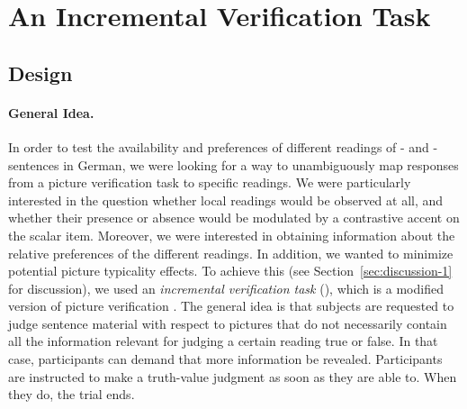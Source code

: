 \documentclass[fleqn,reqno,10pt]{article}
\newcommand{\as}{\acro{as}}
\renewcommand{\es}{\acro{es}}
\begin{document}
\section{An Incremental Verification Task}
\label{sec:exp}

\subsection{Design}
\label{sec:design}

\paragraph{General Idea.} In order to test the availability and
preferences of different readings of \as- and \es-sentences in German,
we were looking for a way to unambiguously map responses from a
picture verification task to specific readings. We were particularly
interested in the question whether local readings would be observed at
all, and whether their presence or absence would be modulated by a
contrastive accent on the scalar item. Moreover, we were interested in
obtaining information about the relative preferences of the different
readings. In addition, we wanted to minimize potential picture
typicality effects. To achieve this (see
Section~\ref{sec:discussion-1} for discussion), we used an
\emph{incremental verification task} (), which is a
modified version of picture verification
\citep[see][]{Conroy2008}. The general idea is that subjects are
requested to judge sentence material with respect to pictures that do
not necessarily contain all the information relevant for judging a
certain reading true or false. In that case, participants can demand
that more information be revealed. Participants are instructed to make
a truth-value judgment as soon as they are able to. When they do, the
trial ends.
\end{document}
